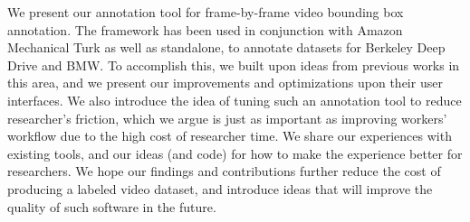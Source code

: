 We present our annotation tool for frame-by-frame video bounding box annotation.
The framework has been used in conjunction with Amazon Mechanical Turk as well as standalone, to annotate datasets for Berkeley Deep Drive and BMW.
To accomplish this, we built upon ideas from previous works in this area, and we present our improvements and optimizations upon their user interfaces.
We also introduce the idea of tuning such an annotation tool to reduce researcher's friction, which we argue is just as important as improving workers' workflow due to the high cost of researcher time.
We share our experiences with existing tools, and our ideas (and code) for how to make the experience better for researchers.
We hope our findings and contributions further reduce the cost of producing a labeled video dataset, and introduce ideas that will improve the quality of such software in the future.
